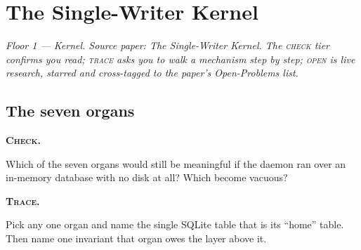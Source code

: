 %
%

\providecommand{\wbstar}{\ensuremath{\bigstar}}
\providecommand{\wbq}[3]{%
  \par\vspace{6pt}\noindent
  {\scshape\bfseries\textcolor{hhcobalt}{#1.}}\enspace{\footnotesize\textcolor{hhgray}{#2}}\par
  \nopagebreak\vspace{2pt}\noindent #3\par\vspace{2pt}%
}

\section{The Single-Writer Kernel}
\label{wb:swk}

\noindent\emph{Floor 1 --- Kernel. Source paper: \emph{The Single-Writer Kernel}.
The \textsc{check} tier confirms you read; \textsc{trace} asks you to walk a
mechanism step by step; \textsc{open} is live research, starred and cross-tagged to
the paper's Open-Problems list.}

\subsection*{The seven organs}

\wbq{Check}{Q1}{Which of the seven organs would still be meaningful if the daemon
ran over an in-memory database with no disk at all? Which become vacuous?}

\wbq{Trace}{Q2}{Pick any one organ and name the single SQLite table that is its
``home'' table. Then name one invariant that organ owes the layer above it.}

